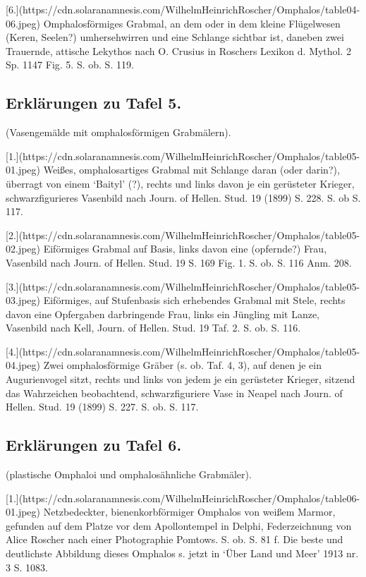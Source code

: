 \documentclass[a4paper, 11pt, oneside]{article}
\begin{document}
[6.](https://cdn.solaranamnesis.com/WilhelmHeinrichRoscher/Omphalos/table04-06.jpeg) Omphalosförmiges Grabmal, an dem oder in dem kleine Flügelwesen (Keren, Seelen?) umhersehwirren und eine Schlange sichtbar ist, daneben zwei Trauernde, attische Lekythos nach O. Crusius in Roschers Lexikon d. Mythol. 2 Sp. 1147 Fig. 5. S. ob. S. 119.
\clearpage
\subsection{Erklärungen zu Tafel 5.}

(Vasengemälde mit omphalosförmigen Grabmälern).

[1.](https://cdn.solaranamnesis.com/WilhelmHeinrichRoscher/Omphalos/table05-01.jpeg) Weißes, omphalosartiges Grabmal mit Schlange daran (oder darin?), überragt von einem `Baityl' (?), rechts und links davon je ein gerüsteter Krieger, schwarzfigurieres Vasenbild nach Journ. of Hellen. Stud. 19 (1899) S. 228. S. ob S. 117.

[2.](https://cdn.solaranamnesis.com/WilhelmHeinrichRoscher/Omphalos/table05-02.jpeg) Eiförmiges Grabmal auf Basis, links davon eine (opfernde?) Frau, Vasenbild nach Journ. of Hellen. Stud. 19 S. 169 Fig. 1. S. ob. S. 116 Anm. 208.

[3.](https://cdn.solaranamnesis.com/WilhelmHeinrichRoscher/Omphalos/table05-03.jpeg) Eiförmiges, auf Stufenbasis sich erhebendes Grabmal mit Stele, rechts davon eine Opfergaben darbringende Frau, links ein Jüngling mit Lanze, Vasenbild nach Kell, Journ. of Hellen. Stud. 19 Taf. 2. S. ob. S. 116.

[4.](https://cdn.solaranamnesis.com/WilhelmHeinrichRoscher/Omphalos/table05-04.jpeg) Zwei omphalosförmige Gräber (s. ob. Taf. 4, 3), auf denen je ein Augurienvogel sitzt, rechts und links von jedem je ein gerüsteter Krieger, sitzend das Wahrzeichen beobachtend, schwarzfiguriere Vase in Neapel nach Journ. of Hellen. Stud. 19 (1899) S. 227. S. ob. S. 117.
\clearpage
\subsection{Erklärungen zu Tafel 6.}

(plastische Omphaloi und omphalosähnliche Grabmäler).

[1.](https://cdn.solaranamnesis.com/WilhelmHeinrichRoscher/Omphalos/table06-01.jpeg) Netzbedeckter, bienenkorbförmiger Omphalos von weißem Marmor, gefunden auf dem Platze vor dem Apollontempel in Delphi, Federzeichnung von Alice Roscher nach einer Photographie Pomtows. S. ob. S. 81 f. Die beste und deutlichste Abbildung dieses Omphalos s. jetzt in `Über Land und Meer' 1913 nr. 3 S. 1083.
\end{document}
